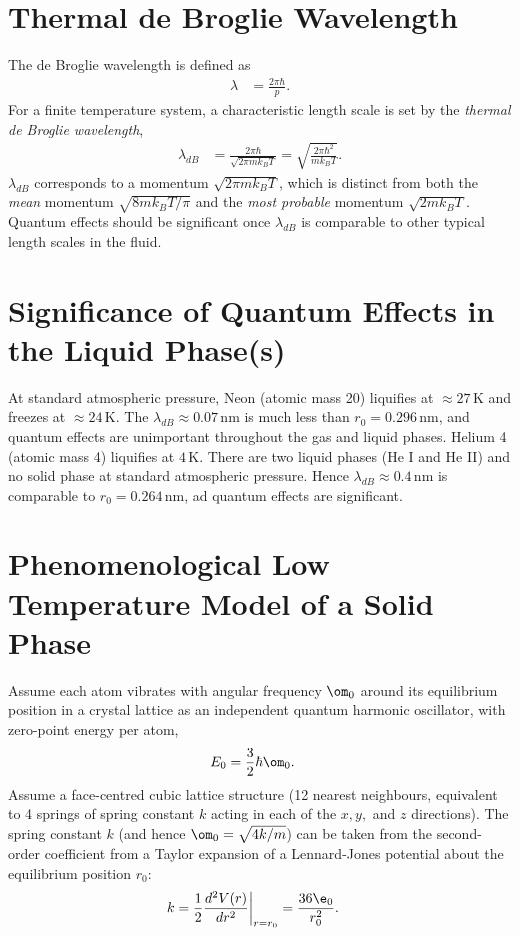 \documentclass[qo.tex]{subfiles}
\begin{document}
\section{Thermal de Broglie Wavelength}
The de Broglie wavelength is defined as 
\begin{align}
    \lambda &= \frac{2\pi\hbar}{p}.
\end{align}
For a finite temperature system, a characteristic length scale is set by the \emph{thermal de Broglie wavelength},
\begin{align}
    \lambda_{dB} &= \frac{2\pi\hbar}{\sqrt{2\pi mk_BT}} = \sqrt{\frac{2\pi\hbar^2}{mk_BT}}.
\end{align}
$\lambda_{dB}$ corresponds to a momentum $\sqrt{2\pi mk_BT}$, which is distinct from both the \emph{mean} momentum $\sqrt{8mk_BT/\pi}$ and the \emph{most probable} momentum $\sqrt{2mk_BT}$.
Quantum effects should be significant once $\lambda_{dB}$ is comparable to other typical length scales in the fluid. 

\section{Significance of Quantum Effects in the Liquid Phase(s)}
At standard atmospheric pressure, Neon (atomic mass 20) liquifies at $\approx27\,$K and freezes at $\approx24\,$K.
The $\lambda_{dB}\approx0.07\,$nm is much less than $r_0=0.296\,$nm, and quantum effects are unimportant throughout the gas and liquid phases. 
Helium 4 (atomic mass 4) liquifies at $4\,$K.
There are two liquid phases (He I and He II) and no solid phase at standard atmospheric pressure. 
Hence $\lambda_{dB}\approx0.4\,$nm is comparable to $r_0=0.264\,$nm, ad quantum effects are significant.

\section{Phenomenological Low Temperature Model of a Solid Phase}
Assume each atom vibrates with angular frequency $\om_0$ around its equilibrium position in a crystal lattice as an independent quantum harmonic oscillator, with zero-point energy per atom,
\begin{align}
    E_0 &= \frac32\hbar\om_0.
\end{align}
Assume a face-centred cubic lattice structure (12 nearest neighbours, equivalent to 4 springs of spring constant $k$ acting in each of the $x,y,$ and $z$ directions).
The spring constant $k$ (and hence $\om_0=\sqrt{4k/m}$) can be taken from the second-order coefficient from a Taylor expansion of a Lennard-Jones potential about the equilibrium position $r_0$:
\begin{align}
    k &= \frac12 \frac{d^2V(r)}{dr^2}\bigg|_{r=r_0} = \frac{36\e_0}{r^2_0}.
\end{align}
\end{document}
